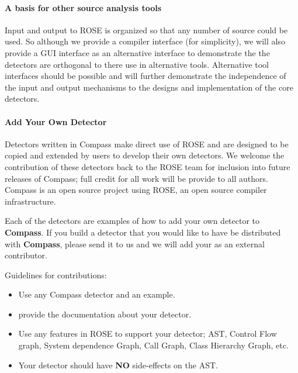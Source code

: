 \paragraph{A basis for other source analysis tools}
   Input and output to ROSE is organized so that any number of source could be used.
So although we provide a compiler interface (for simplicity), we will also provide a 
GUI interface as an alternative interface to demonstrate the the detectors are orthogonal
to there use in alternative tools.  Alternative tool interfaces should be possible 
and will further demonstrate the independence of the input and output mechanisms to
the designs and implementation of the core detectors.

\paragraph{Add Your Own Detector}

    Detectors written in Compass make direct use of ROSE and are 
designed to be copied and extended by users to develop their own 
detectors. We welcome the contribution of these detectors back to 
the ROSE team for inclusion into future releases of Compass;
full credit for all work will be provide to all authors.
Compass is an open source project using ROSE, an open source
compiler infrastructure.

    Each of the detectors are examples of how to
add your own detector to {\bf Compass}.  If you
build a detector that you would like to have be 
distributed with {\bf Compass}, please send it to
us and we will add your as an external contributor.

  Guidelines for contributions:
\begin{itemize}
   \item Use any Compass detector and an example.
   \item provide the documentation about your detector.
   \item Use any features in ROSE to support your detector; AST, Control Flow graph,
    System dependence Graph, Call Graph, Class Hierarchy Graph, etc.
   \item Your detector should have {\bf NO} side-effects on the AST.
\end{itemize}

